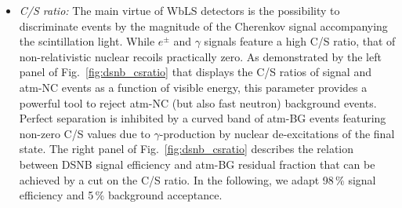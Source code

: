 \begin{itemize}
\item {\it C/S ratio:} The main virtue of WbLS detectors is the possibility to discriminate events by the magnitude  of the Cherenkov signal accompanying the scintillation light. While $e^\pm$ and $\gamma$ signals feature a high C/S ratio, that of non-relativistic nuclear recoils practically zero. As demonstrated by the left panel of Fig.~\ref{fig:dsnb_csratio} that displays the C/S ratios of signal and atm-NC events as a function of visible energy, this parameter provides a powerful tool to reject atm-NC (but also fast neutron) background events. Perfect separation is inhibited by a curved band of atm-BG events featuring non-zero C/S values due to $\gamma$-production by nuclear de-excitations of the final state. The right panel of Fig.~\ref{fig:dsnb_csratio} describes the relation between DSNB signal efficiency and atm-BG residual fraction that can be achieved by a cut on the C/S ratio. In the following, we adapt 98\,\% signal efficiency and 5\,\% background acceptance.



\end{itemize}

